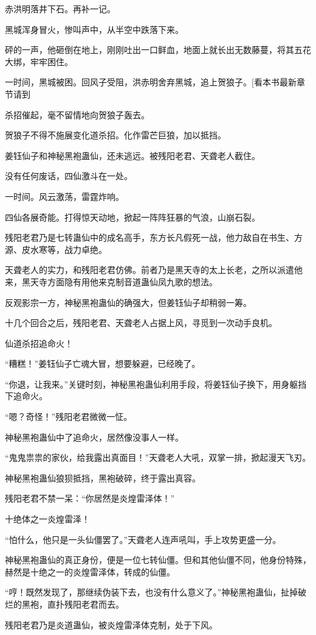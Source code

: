 \begin{this_body}
赤洪明落井下石。再补一记。

黑城浑身冒火，惨叫声中，从半空中跌落下来。

砰的一声，他砸倒在地上，刚刚吐出一口鲜血，地面上就长出无数藤蔓，将其五花大绑，牢牢困住。

一时间，黑城被困。回风子受阻，洪赤明舍弃黑城，追上贺狼子。[看本书最新章节请到

杀招催起，毫不留情地向贺狼子轰去。

贺狼子不得不施展变化道杀招。化作雷芒巨狼，加以抵挡。

姜钰仙子和神秘黑袍蛊仙，还未逃远。被残阳老君、天聋老人截住。

没有任何废话，四仙激斗在一处。

一时间。风云激荡，雷霆炸响。

四仙各展奇能。打得惊天动地，掀起一阵阵狂暴的气浪，山崩石裂。

残阳老君乃是七转蛊仙中的成名高手，东方长凡假死一战，他力敌自在书生、方源、皮水寒等，战力卓绝。

天聋老人的实力，和残阳老君仿佛。前者乃是黑天寺的太上长老，之所以派遣他来，黑天寺方面隐有用他来克制音道蛊仙凤九歌的想法。

反观影宗一方，神秘黑袍蛊仙的确强大，但姜钰仙子却稍弱一筹。

十几个回合之后，残阳老君、天聋老人占据上风，寻觅到一次动手良机。

仙道杀招追命火！

“糟糕！”姜钰仙子亡魂大冒，想要躲避，已经晚了。

“你退，让我来。”关键时刻，神秘黑袍蛊仙利用手段，将姜钰仙子换下，用身躯挡下追命火。

“嗯？奇怪！”残阳老君微微一怔。

神秘黑袍蛊仙中了追命火，居然像没事人一样。

“鬼鬼祟祟的家伙，给我露出真面目！”天聋老人大吼，双掌一排，掀起漫天飞刃。

神秘黑袍蛊仙狼狈抵挡，黑袍破碎，终于露出真容。

残阳老君不禁一呆：“你居然是炎煌雷泽体！”

十绝体之一炎煌雷泽！

“怕什么，他只是一头仙僵罢了。”天聋老人连声吼叫，手上攻势更盛一分。

神秘黑袍蛊仙的真正身份，便是一位七转仙僵。但和其他仙僵不同，他身份特殊，赫然是十绝之一的炎煌雷泽体，转成的仙僵。

“哼！既然发现了，那继续伪装下去，也没有什么意义了。”神秘黑袍蛊仙，扯掉破烂的黑袍，直扑残阳老君而去。

残阳老君乃是炎道蛊仙，被炎煌雷泽体克制，处于下风。


\end{this_body}
